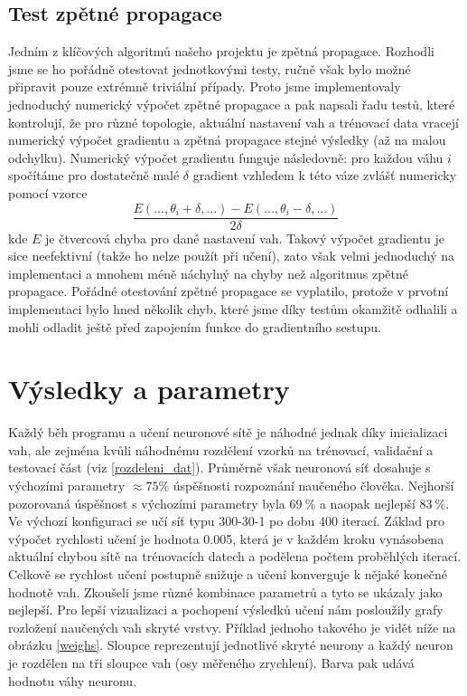 \documentclass[a4paper, 10pt, twocolumn]{article}
\begin{document}
    \subsection{Test zpětné propagace}
    Jedním z klíčových algoritmů našeho projektu je zpětná propagace.
    Rozhodli jsme se ho pořádně otestovat jednotkovými testy, ručně však bylo možné připravit pouze extrémně triviální případy.
    Proto jsme implementovaly jednoduchý numerický výpočet zpětné propagace a pak napsali řadu testů, které kontrolují, že pro různé topologie, aktuální nastavení vah a trénovací data vracejí numerický výpočet gradientu a zpětná propagace stejné výsledky (až na malou odchylku).
    Numerický výpočet gradientu funguje následovně: pro každou váhu $i$ spočítáme pro dostatečně malé $\delta$ gradient vzhledem k této váze zvlášť numericky pomocí vzorce
    $$\frac{E(\ldots, \theta_i + \delta, \ldots) - E(\ldots, \theta_i - \delta, \ldots)}{2\delta}$$
    kde $E$ je čtvercová chyba pro dané nastavení vah.
    Takový výpočet gradientu je sice neefektivní (takže ho nelze použít při učení), zato však velmi jednoduchý na implementaci a mnohem méně náchylný na chyby než algoritmus zpětné propagace.
    Pořádné otestování zpětné propagace se vyplatilo, protože v prvotní implementaci bylo hned několik chyb, které jsme díky testům okamžitě odhalili a mohli odladit ještě před zapojením funkce do gradientního sestupu.


\section{Výsledky a parametry}
Každý běh programu a učení neuronové sítě je náhodné jednak díky inicializaci vah, ale zejména kvůli náhodnému rozdělení vzorků na trénovací, validační a testovací část (viz \ref{rozdeleni_dat}). Průměrně však neuronová síť dosahuje s výchozími parametry $\approx 75\% $ úspěšnosti rozpoznání naučeného člověka. Nejhorší pozorovaná úspěšnost s výchozími parametry byla $69~\%$ a naopak nejlepší $83~\%$. Ve výchozí konfiguraci se učí síť typu 300-30-1 po dobu 400 iterací. Základ pro výpočet rychlosti učení je hodnota 0.005, která je v každém kroku vynásobena aktuální chybou sítě na trénovacích datech a podělena počtem proběhlých iterací. Celkově se rychlost učení postupně snižuje a učení konverguje k nějaké konečné hodnotě vah. Zkoušeli jsme různé kombinace parametrů a tyto se ukázaly jako nejlepší. Pro lepší vizualizaci a pochopení výsledků učení nám posloužily grafy rozložení naučených vah skryté vrstvy. Příklad jednoho takového je vidět níže na obrázku \ref{weighs}. Sloupce reprezentují jednotlivé skryté neurony a každý neuron je rozdělen na tři sloupce vah (osy měřeného zrychlení). Barva pak udává hodnotu váhy neuronu.  
\end{document}
